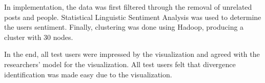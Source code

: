 In implementation, the data was first filtered through the removal of unrelated posts and people. Statistical Linguistic Sentiment Analysis was used to determine the user\vtick s sentiment. Finally, clustering was done using Hadoop, producing a cluster with 30 nodes. 


In the end, all test users were impressed by the visualization and agreed with the researchers’ model for the visualization. All test users felt that divergence identification was made easy due to the visualization. 


\begin{comment}
\newpage
\begin{landscape}
Table \ref{summaryT} shows a summary of our review of related literature with respect to community detection, similarity parameters, and evaluation metrics for each paper.
	\begin{longtabu} to 1.5\textwidth{|X|X|X|X|X|}
	\caption {Summary of Review of Related Literature}\label{summaryT} \\
	\hline
	Reference & Community Detection Algorithms & Sentiment Analysis Model & Other parameters & Community Evaluation & Output\\
	\hline
	\cite{Clauset:2004} & Greedy Optimization of Modularity & Not mentioned & Not mentioned & Not mentioned & Application of hierarchical agglomeration algorithm \\
	\hline
	\cite{Tang:2010} & Clique percolation method, similarity detection, divisive and agglomerative clustering & Not mentioned & Not mentioned & Not mentioned & Introduction to community detection in social media \\
	\hline
	\cite{Lancichinetti:2011} & Order Statistics Local Optimization Method (OSLOM) & Not mentioned & Not mentioned & Not mentioned & Application of OSLOM \\
	\hline
	\cite{Lim:2012:0} & Topic driven community detection, Infomap method, Clique percolation method & Not mentioned & Not mentioned & Not mentioned & Communities based on interest categories \\
	\hline
	\cite{Lim:2012:1} & Topic driven community detection, Infomap method, Clique percolation method & Not mentioned & Not mentioned & Not mentioned & Communities based on interest categories \\
	\hline
	\cite{Papadopoulos:2012} & Comparison of Existing Methods & Not mentioned & Not mentioned & Not mentioned & Overview of community detection and classification of classification of community detection algorithms \\

\end{comment}
